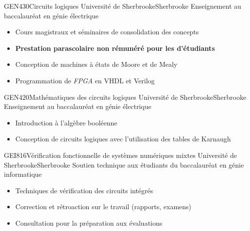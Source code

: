 
{GEN430}{Circuits logiques}
{Université de Sherbrooke}{Sherbrooke}
{Enseignement au baccalauréat en génie électrique}
{\vspace{-12pt}
\begin{itemize}
	\item Cours magistraux et séminaires de consolidation des concepts
	\item \textbf{Prestation parascolaire non rémunéré pour les d'étudiants}
	\item Conception de machines à états de Moore et de Mealy
	\item Programmation de \textit{FPGA} en VHDL et Verilog
\end{itemize}}

{GEN420}{Mathématiques des circuits logiques}
{Université de Sherbrooke}{Sherbrooke}
{Enseignement au baccalauréat en génie électrique}
{\vspace{-12pt}
\begin{itemize}
	\item Introduction à l'algèbre booléenne
	\item Conception de circuits logiques avec l'utilisation des tables de Karnaugh
\end{itemize}}

{GEI816}{Vérification fonctionnelle de systèmes numériques mixtes}
{Université de Sherbrooke}{Sherbrooke}
{Soutien technique aux étudiants du baccalauréat en génie informatique}
{\vspace{-12pt}
\begin{itemize}
	\item Techniques de vérification des circuits intégrés
	\item Correction et rétroaction sur le travail (rapports, examens)
	\item Consultation pour la préparation aux évaluations
\end{itemize}}

